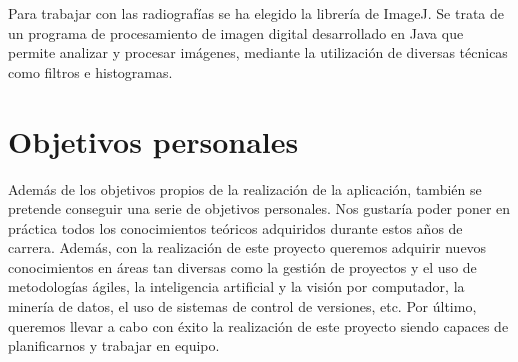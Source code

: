 Para trabajar con las radiografías se ha elegido la librería de ImageJ. Se trata de un programa de procesamiento de imagen digital desarrollado en Java que permite analizar y procesar imágenes, mediante la utilización de diversas técnicas como filtros e histogramas.

\section{Objetivos personales}
Además de los objetivos propios de la realización de la aplicación, también se pretende conseguir una serie de objetivos personales.
Nos gustaría poder poner en práctica todos los conocimientos teóricos adquiridos durante estos años de carrera. Además, con la realización de este proyecto queremos adquirir nuevos conocimientos en áreas tan diversas como la gestión de proyectos y el uso de metodologías ágiles, la inteligencia artificial y la visión por computador, la minería de datos, el uso de sistemas de control de versiones, etc.
Por último, queremos llevar a cabo con éxito la realización de este proyecto siendo capaces de planificarnos y trabajar en equipo.

